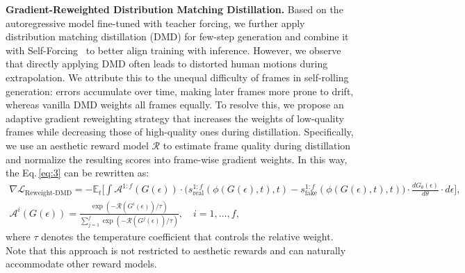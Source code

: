 \documentclass{llmxive}
\begin{document}
\noindent
\textbf{Gradient-Reweighted Distribution Matching Distillation.}
% 
Based on the autoregressive model fine-tuned with teacher forcing, we further apply distribution matching distillation (DMD) for few-step generation and combine it with Self-Forcing~\cite{huang2025self} to better align training with inference.
%
However, we observe that directly applying DMD often leads to distorted human motions during extrapolation.
%
We attribute this to the unequal difficulty of frames in self-rolling generation: errors accumulate over time, making later frames more prone to drift, whereas vanilla DMD weights all frames equally.
%
To resolve this, we propose an adaptive gradient reweighting strategy that increases the weights of low-quality frames while decreasing those of high-quality ones during distillation.
% 
Specifically, we use an aesthetic reward model $\mathcal{R}$ to estimate frame quality during distillation and normalize the resulting scores into frame-wise gradient weights.
% 
In this way, the Eq.\,\ref{eq:3} can be rewritten as:
% 
\begin{equation}
\begin{gathered}
\nabla \mathcal{L}_{\text{Reweight-DMD}} 
= - \mathbb{E}_{t} \Biggl[
\int 
\mathcal{A}^{1:f} (G(\epsilon)) 
\cdot
\big(
s_{\text{real}}^{1:f} (\phi(G(\epsilon), t), t)
-
s_{\text{fake}}^{1:f} (\phi(G(\epsilon), t), t)
\big)
\cdot
\frac{d G_{\theta}(\epsilon)}{d\theta}
\cdot
d\epsilon
\Biggr], \\
\mathcal{A}^{i} (G(\epsilon)) = \frac{\exp(-\mathcal{R} (G^{i}(\epsilon)) / \tau)}{\sum_{j=1}^{f} \exp(-\mathcal{R} (G^{j}(\epsilon)) / \tau)}, \quad i=1, \dots, f,
\end{gathered}
\end{equation}
% 
where $\tau$ denotes the temperature coefficient that controls the relative weight. Note that this approach is not restricted to aesthetic rewards and can naturally accommodate other reward models.
\end{document}
